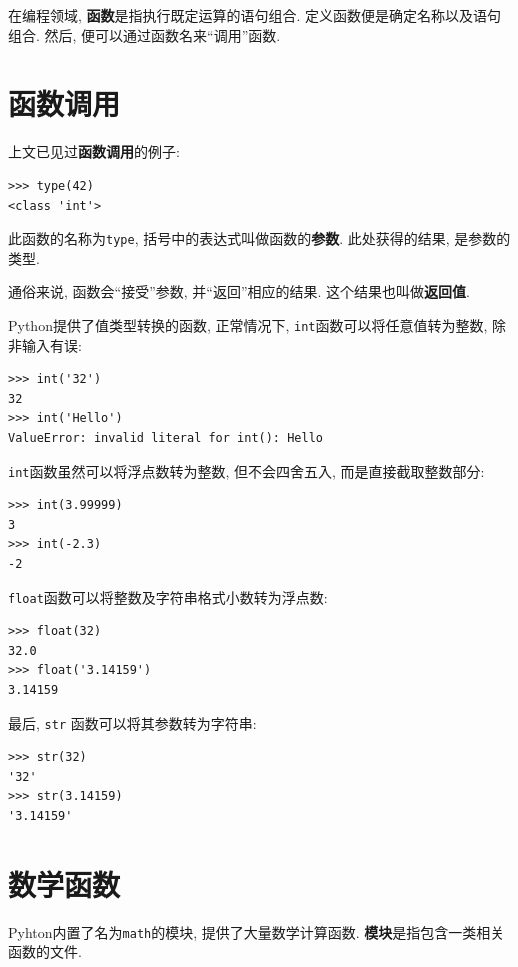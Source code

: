 \documentclass[10pt]{book}
\begin{document}
在编程领域, {\bf 函数}是指执行既定运算的语句组合. 
定义函数便是确定名称以及语句组合. 然后, 便可以通过函数名来``调用''函数. 

\section{函数调用}
\label{functionchap}

上文已见过{\bf 函数调用}的例子:

\begin{verbatim}
>>> type(42)
<class 'int'>
\end{verbatim}
%
此函数的名称为{\tt type},  括号中的表达式叫做函数的{\bf 参数}. 
此处获得的结果, 是参数的类型. 

通俗来说, 函数会``接受''参数, 并``返回''相应的结果. 
这个结果也叫做{\bf 返回值}. 

Python提供了值类型转换的函数, 正常情况下, 
{\tt int}函数可以将任意值转为整数, 
除非输入有误:

\begin{verbatim}
>>> int('32')
32
>>> int('Hello')
ValueError: invalid literal for int(): Hello
\end{verbatim}
%
{\tt int}函数虽然可以将浮点数转为整数, 
但不会四舍五入, 而是直接截取整数部分:

\begin{verbatim}
>>> int(3.99999)
3
>>> int(-2.3)
-2
\end{verbatim}
%
{\tt float}函数可以将整数及字符串格式小数转为浮点数:

\begin{verbatim}
>>> float(32)
32.0
>>> float('3.14159')
3.14159
\end{verbatim}
%
最后, {\tt str} 函数可以将其参数转为字符串:

\begin{verbatim}
>>> str(32)
'32'
>>> str(3.14159)
'3.14159'
\end{verbatim}
%

\section{数学函数}

Pyhton内置了名为{\tt math}的模块, 提供了大量数学计算函数. 
{\bf 模块}是指包含一类相关函数的文件. 
\end{document}
